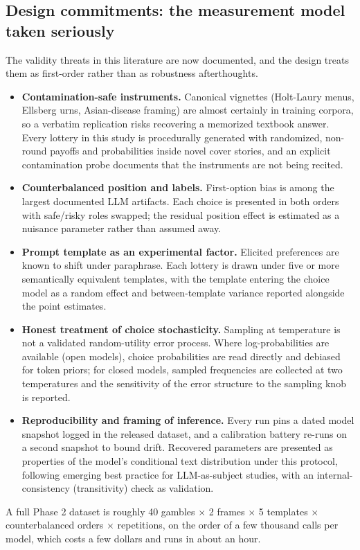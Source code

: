 \documentclass[11pt]{article}
\begin{document}
\subsection{Design commitments: the measurement model taken seriously}
The validity threats in this literature are now documented, and the design treats them as first-order
rather than as robustness afterthoughts.
\begin{itemize}
  \item \textbf{Contamination-safe instruments.} Canonical vignettes (Holt-Laury menus, Ellsberg urns,
  Asian-disease framing) are almost certainly in training corpora, so a verbatim replication risks
  recovering a memorized textbook answer. Every lottery in this study is procedurally generated with
  randomized, non-round payoffs and probabilities inside novel cover stories, and an explicit
  contamination probe documents that the instruments are not being recited.
  \item \textbf{Counterbalanced position and labels.} First-option bias is among the largest documented
  LLM artifacts. Each choice is presented in both orders with safe/risky roles swapped; the residual
  position effect is estimated as a nuisance parameter rather than assumed away.
  \item \textbf{Prompt template as an experimental factor.} Elicited preferences are known to shift
  under paraphrase. Each lottery is drawn under five or more semantically equivalent templates, with the
  template entering the choice model as a random effect and between-template variance reported alongside
  the point estimates.
  \item \textbf{Honest treatment of choice stochasticity.} Sampling at temperature is not a validated
  random-utility error process. Where log-probabilities are available (open models), choice
  probabilities are read directly and debiased for token priors; for closed models, sampled frequencies
  are collected at two temperatures and the sensitivity of the error structure to the sampling knob is
  reported.
  \item \textbf{Reproducibility and framing of inference.} Every run pins a dated model snapshot logged
  in the released dataset, and a calibration battery re-runs on a second snapshot to bound drift.
  Recovered parameters are presented as properties of the model's conditional text distribution under
  this protocol, following emerging best practice for LLM-as-subject studies, with an internal-consistency
  (transitivity) check as validation.
\end{itemize}
A full Phase 2 dataset is roughly 40 gambles $\times$ 2 frames $\times$ 5 templates $\times$
counterbalanced orders $\times$ repetitions, on the order of a few thousand calls per model, which
costs a few dollars and runs in about an hour.
\end{document}
